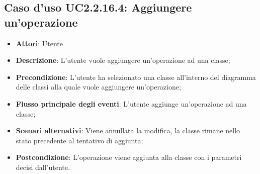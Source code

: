 \documentclass[../AnalisiDeiRequisiti.tex]{subfiles}
\begin{document}
			\subsection{Caso d'uso UC2.2.16.4: Aggiungere un'operazione}
			\begin{itemize}
				\item \textbf{Attori}: Utente
				\item \textbf{Descrizione}: L'utente vuole aggiungere un'operazione ad una classe;
				\item \textbf{Precondizione}: L'utente ha selezionato una classe all'interno del diagramma delle classi alla quale vuole aggiungere un'operazione;
				\item \textbf{Flusso principale degli eventi}: L'utente aggiunge un'operazione ad una classe;
				\item \textbf{Scenari alternativi}: Viene annullata la modifica, la classe rimane nello stato precedente al tentativo di aggiunta;
				\item \textbf{Postcondizione}: L'operazione viene aggiunta alla classe con i parametri decisi dall'utente.
			\end{itemize}
\end{document}
